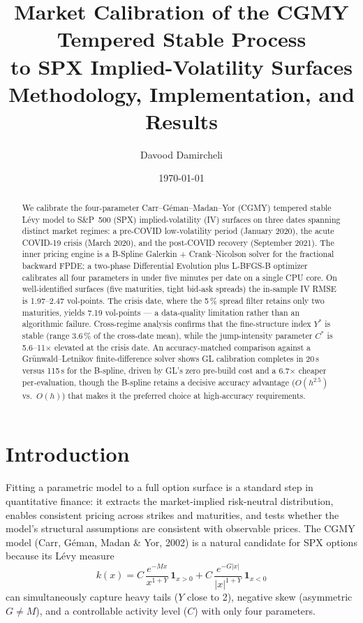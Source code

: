 \documentclass[11pt,a4paper]{article}
\title{%
  \textbf{Market Calibration of the CGMY Tempered Stable Process\\
  to SPX Implied-Volatility Surfaces}\\[0.5em]
  \large Methodology, Implementation, and Results
}
\author{Davood Damircheli}
\date{\today}
\begin{document}
\maketitle

\begin{abstract}
We calibrate the four-parameter
Carr--G\'{e}man--Madan--Yor (CGMY) tempered stable L\'{e}vy model
to S\&P~500 (SPX) implied-volatility (IV) surfaces on three dates spanning
distinct market regimes: a pre-COVID low-volatility period (January 2020),
the acute COVID-19 crisis (March 2020), and the post-COVID recovery
(September 2021).
The inner pricing engine is a B-Spline Galerkin + Crank--Nicolson solver
for the fractional backward FPDE; a two-phase Differential Evolution plus
L-BFGS-B optimizer calibrates all four parameters in under five minutes per
date on a single CPU core.
On well-identified surfaces (five maturities, tight bid-ask spreads)
the in-sample IV RMSE is 1.97--2.47 vol-points.
The crisis date, where the 5\,\% spread filter retains only two maturities,
yields 7.19 vol-points — a data-quality limitation rather than an algorithmic
failure.
Cross-regime analysis confirms that the fine-structure index $Y^*$ is stable
(range 3.6\,\% of the cross-date mean), while the jump-intensity parameter
$C^*$ is 5.6--11$\times$ elevated at the crisis date.
An accuracy-matched comparison against a Gr\"{u}nwald--Letnikov
finite-difference solver shows GL calibration completes in 20\,s versus
115\,s for the B-spline, driven by GL's zero pre-build cost and a 6.7$\times$
cheaper per-evaluation, though the B-spline retains a decisive accuracy
advantage ($O(h^{2.5})$ vs.\ $O(h)$) that makes it the preferred choice at
high-accuracy requirements.
\end{abstract}

\tableofcontents
\listoffigures
\listoftables
\clearpage

\section{Introduction}
\label{sec:intro}

Fitting a parametric model to a full option surface is a standard step in
quantitative finance: it extracts the market-implied risk-neutral distribution,
enables consistent pricing across strikes and maturities, and tests whether the
model's structural assumptions are consistent with observable prices.
The CGMY model (Carr, Géman, Madan \& Yor, 2002) is a natural candidate for SPX options because its
L\'{e}vy measure
\[
  k(x) = C\,\frac{e^{-M x}}{x^{1+Y}}\,\mathbf{1}_{x>0}
        + C\,\frac{e^{-G|x|}}{|x|^{1+Y}}\,\mathbf{1}_{x<0}
\]
can simultaneously capture heavy tails ($Y$ close to 2), negative skew
(asymmetric $G \neq M$), and a controllable activity level ($C$) with only
four parameters.
\end{document}
